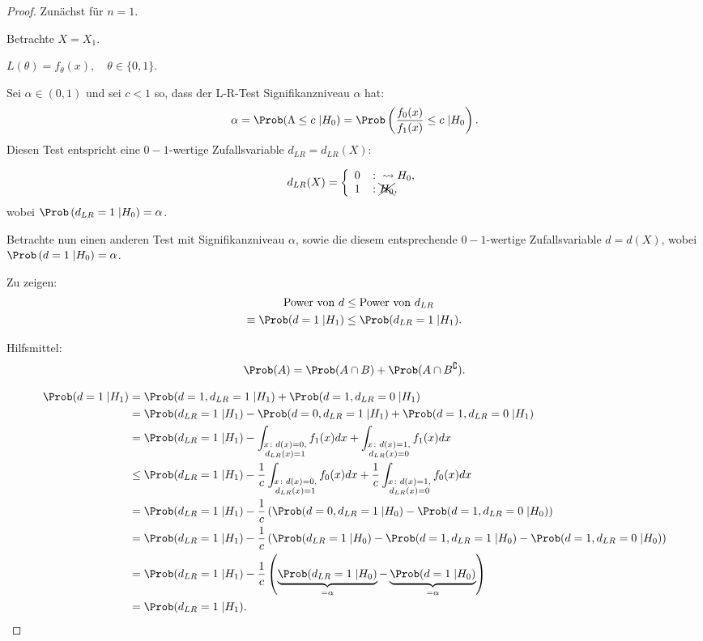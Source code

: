 \documentclass{tstextbook}
\begin{document}
\begin{proof}
	Zunächst für $ n=1 $. 
	
	Betrachte $ X=X_1 $. 
	
	$ L(\theta)=f_\theta(x), \quad \theta\in\{0,1\} $. 
	
	Sei $ \alpha\in(0,1) $ und sei $ c<1 $ so, dass der L-R-Test Signifikanzniveau $ \alpha $ hat: \\
	\[
	\alpha = \Prob(\Lambda\le c\;|H_0) = \Prob\left(\frac{f_0(x)}{f_1(x)}\le c \;|H_0\right).
	\]
	Diesen Test entspricht eine $ 0-1 $-wertige Zufallsvariable $ d_{LR}=d_{LR}(X) \colon $
	
	\[
	d_{LR}(X)=\left\{\begin{array}{ll}
		0 & \colon \rightsquigarrow H_0, \\
		1 & \colon \xcancel{H_0},
	\end{array}\right.
	\]
	wobei $ \Prob\left(d_{LR}=1\;|H_0\right)=\alpha $. 
	
	Betrachte nun einen anderen Test mit Signifikanzniveau $ \alpha $, sowie die diesem entsprechende $ 0-1 $-wertige Zufallsvariable $ d=d(X) $, wobei $ \Prob\left(d=1\;|H_0\right)=\alpha $. 
	
	Zu zeigen: 
	\[
	\begin{aligned}
		\text{Power von }  d & \le \text{Power von } d_{LR} \\
		\equiv \Prob(d=1\;|H_1) & \le \Prob(d_{LR}=1\;|H_1).
	\end{aligned}
	\]
	
	Hilfsmittel: 
	\[
	\Prob(A) = \Prob(A\cap B) +\Prob(A\cap B^\complement).
	\]
	
	\[
	\begin{aligned}
		\Prob(d=1\;|H_1) & = \Prob(d=1,d_{LR}=1\;|H_1) + \Prob(d=1,d_{LR}=0\;|H_1) \\
		& = \Prob(d_{LR}=1\;|H_1)-\Prob(d=0,d_{LR}=1\;|H_1) + \Prob(d=1,d_{LR}=0\;|H_1) \\
		& = \Prob(d_{LR}=1\;|H_1) - \int_{\substack{x\colon d(x)=0, \\ d_{LR}(x)=1}} f_1(x) dx + \int_{\substack{x\colon d(x)=1, \\ d_{LR}(x)=0}} f_1(x) dx \\
		& \le \Prob(d_{LR}=1\;|H_1) - \frac{1}{c}\int_{\substack{x\colon d(x)=0, \\ d_{LR}(x)=1}} f_0(x) dx + \frac{1}{c}\int_{\substack{x\colon d(x)=1, \\ d_{LR}(x)=0}} f_0(x) dx \\
		& = \Prob(d_{LR}=1\;|H_1) - \frac{1}{c}\left(\Prob(d=0,d_{LR}=1\;|H_0)-\Prob(d=1,d_{LR}=0\;|H_0)\right) \\
		& = \Prob(d_{LR}=1\;|H_1) - \frac{1}{c}\left(\Prob(d_{LR}=1\;|H_0)-\Prob(d=1,d_{LR}=1\;|H_0)-\Prob(d=1,d_{LR}=0\;|H_0)\right) \\
		& = \Prob(d_{LR}=1\;|H_1) - \frac{1}{c}\left(\underbrace{\Prob(d_{LR}=1\;|H_0)}_{=\alpha}-\underbrace{\Prob(d=1\;|H_0)}_{=\alpha}\right) \\
		& = \Prob(d_{LR}=1\;|H_1).
	\end{aligned}
	\]
	

\end{proof}
\end{document}
